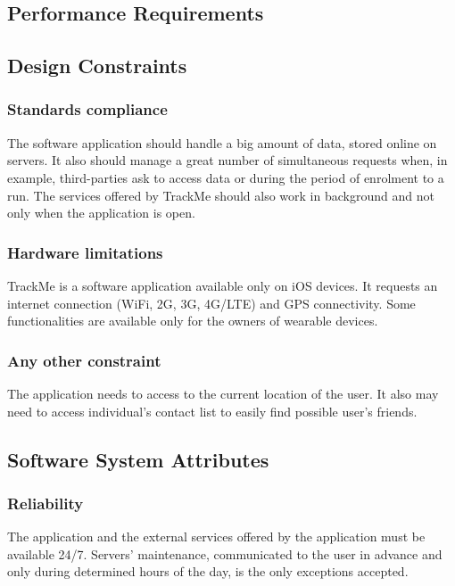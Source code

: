 \documentclass{article}
\begin{document}
\newpage
\subsection{Performance Requirements}
	

\subsection{Design Constraints}

	\subsubsection{Standards compliance}
	The software application should handle a big amount of data, 
	stored online on servers. 
	It also should manage a great number of simultaneous requests 
	when, in example, third-parties ask to access data or during the
	period of enrolment to a run. \newline
	The services offered by TrackMe should also work in background and
	not only when the application is open. 
	
	\subsubsection{Hardware limitations}
	TrackMe is a software application available only on iOS devices. 
	It requests an internet connection (WiFi, 2G, 3G, 4G/LTE) and 
	GPS connectivity. \newline
	Some functionalities are available only for the owners of 
	wearable devices. 

	\subsubsection{Any other constraint}
	The application needs to access to the current location of the 
	user. It also may need to access individual's contact list to
	easily find possible user's friends. 
	
\subsection{Software System Attributes}	

	\subsubsection{Reliability}
	The application and the external services offered by the
	application must be available 24/7. \newline
	Servers' maintenance, communicated to the user in advance
	and only during determined hours of the day, is the only 
	exceptions accepted. 
	
\end{document}
